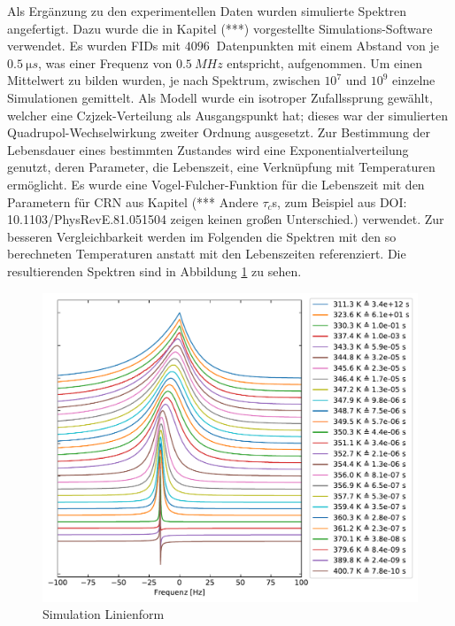 Als Ergänzung zu den experimentellen Daten wurden simulierte Spektren angefertigt. Dazu wurde die in Kapitel (***) vorgestellte Simulations-Software verwendet. Es wurden FIDs mit $\SI{4096}{}$ Datenpunkten mit einem Abstand von je $\SI{0.5}{\micro s}$, was einer Frequenz von $\SI{0.5}{MHz}$ entspricht, aufgenommen. Um einen Mittelwert zu bilden wurden, je nach Spektrum, zwischen $10^{7}$ und $10^{9}$ einzelne Simulationen gemittelt. Als Modell wurde ein isotroper Zufallssprung gewählt, welcher eine Czjzek-Verteilung als Ausgangspunkt hat; dieses war der simulierten Quadrupol-Wechselwirkung zweiter Ordnung ausgesetzt. Zur Bestimmung der Lebensdauer eines bestimmten Zustandes wird eine Exponentialverteilung genutzt, deren Parameter, die Lebenszeit, eine Verknüpfung mit Temperaturen ermöglicht. Es wurde eine Vogel-Fulcher-Funktion für die Lebenszeit mit den Parametern für CRN aus Kapitel (*** Andere $\tau_c$s, zum Beispiel aus DOI: 10.1103/PhysRevE.81.051504 zeigen keinen großen Unterschied.) verwendet. Zur besseren Vergleichbarkeit werden im Folgenden die Spektren mit den so berechneten Temperaturen anstatt mit den Lebenszeiten referenziert. Die resultierenden Spektren sind in Abbildung \ref{fig:res:sim_linienform} zu sehen.
\begin{figure}
	\begin{center}
		\includegraphics[width=\textwidth]{graphics/plot/sim_lineshape.pdf}
	\end{center}
	\caption{Simulation Linienform} \label{fig:res:sim_linienform}
\end{figure}

